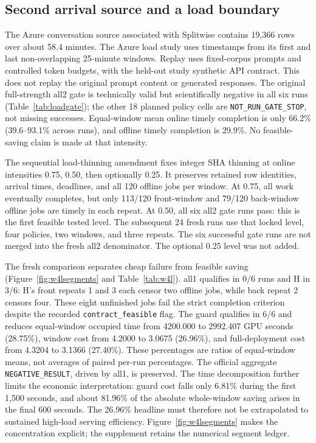 \subsection{Second arrival source and a load boundary}
The Azure conversation source associated with Splitwise
\citep{patel2024splitwise} contains 19,366 rows over about 58.4 minutes. The Azure load study
uses timestamps from its first and last non-overlapping 25-minute windows.
Replay uses fixed-corpus prompts and controlled token budgets, with the held-out study
synthetic API contract. This does not replay the original
prompt content or generated responses. The original
full-strength all2 gate is technically valid but scientifically negative in all
six runs (Table~\ref{tab:loadgate}); the other 18 planned policy cells are
\texttt{NOT\_RUN\_GATE\_STOP}, not missing successes. Equal-window mean online
timely completion is only 66.2\% (39.6--93.1\% across runs), and offline timely
completion is 29.9\%. No feasible-saving claim is made at that intensity.

The sequential load-thinning amendment fixes integer SHA thinning at online
intensities 0.75, 0.50, then optionally 0.25. It preserves retained row identities,
arrival times, deadlines, and all 120 offline jobs per window. At 0.75, all work
eventually completes, but only 113/120 front-window and 79/120 back-window offline
jobs are timely in each repeat. At 0.50, all six all2 gate runs pass: this is the
first feasible tested level. The subsequent 24 fresh runs use that locked level,
four policies, two windows, and three repeats. The six successful gate runs are
not merged into the fresh all2 denominator. The optional 0.25 level was not added.

The fresh comparison separates cheap failure from feasible saving
(Figure~\ref{fig:w4lsegments} and Table~\ref{tab:w4l}).
all1 qualifies in 0/6 runs and H in 3/6: H's front repeats
1 and 3 each censor two offline jobs, while back repeat 2 censors four. These eight unfinished jobs fail the strict completion criterion despite the
recorded \texttt{contract\_feasible} flag.
The guard qualifies in 6/6 and reduces equal-window occupied time from 4200.000
to 2992.407 GPU seconds (28.75\%), window cost from 4.2000 to 3.0675 (26.96\%),
and full-deployment cost from 4.3204 to 3.1366 (27.40\%). These percentages are
ratios of equal-window means, not averages of paired per-run percentages. The
official aggregate \texttt{NEGATIVE\_RESULT}, driven by all1, is preserved.
The time decomposition further limits the economic interpretation: guard cost
falls only 6.81\% during the first 1,500 seconds, and about 81.96\% of the
absolute whole-window saving arises in the final 600 seconds. The 26.96\%
headline must therefore not be extrapolated to sustained high-load serving
efficiency. Figure~\ref{fig:w4lsegments} makes the concentration explicit; the
supplement retains the numerical segment ledger.

